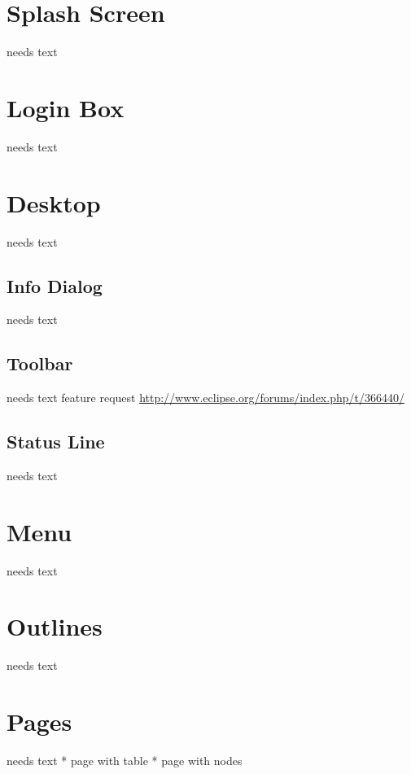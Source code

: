 \documentclass[a4paper,10pt,twoside]{book}
\begin{document}
\section{Splash Screen}
needs text

\section{Login Box}
needs text


\section{Desktop}
needs text

\subsection{Info Dialog}
needs text

\subsection{Toolbar}
needs text
feature request \url{http://www.eclipse.org/forums/index.php/t/366440/}

\subsection{Status Line}
needs text

\section{Menu}
needs text

\section{Outlines}
needs text

\section{Pages}
needs text
    * page with table
	* page with nodes
	
\end{document}
